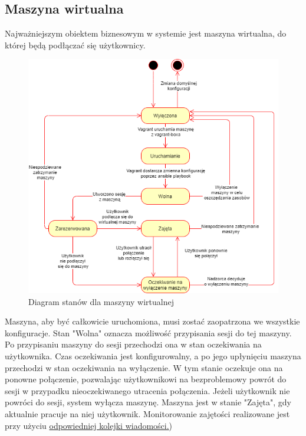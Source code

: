 \documentclass[../opis-rozwiazania.tex]{subfiles}
\begin{document}
\label{state_diagrams}

\subsection{Maszyna wirtualna}
Najważniejszym obiektem biznesowym w systemie jest maszyna wirtualna, do której będą podłączać się użytkownicy.

\begin{figure}[H]
    \centering
    \includegraphics[width=\textwidth]{../diagrams/state_diagrams/virtual_machine.png}
    \caption{Diagram stanów dla maszyny wirtualnej}
    \label{state_vm}
\end{figure}

Maszyna, aby być całkowicie uruchomiona, musi zostać zaopatrzona we wszystkie konfiguracje.
Stan "Wolna" oznacza możliwość przypisania sesji do tej maszyny.
Po przypisaniu maszyny do sesji przechodzi ona w stan oczekiwania na użytkownika. Czas oczekiwania jest konfigurowalny, a po jego upłynięciu maszyna przechodzi w stan oczekiwania na wyłączenie.
W tym stanie oczekuje ona na ponowne połączenie, pozwalając użytkownikowi na bezproblemowy powrót do sesji w przypadku nieoczekiwanego utracenia połączenia. Jeżeli użytkownik nie powróci do sesji, system wyłącza maszynę.
Maszyna jest w stanie "Zajęta", gdy aktualnie pracuje na niej użytkownik. Monitorowanie zajętości realizowane jest przy użyciu \hyperref[modules:broker:queue-users]{odpowiedniej kolejki wiadomości.})
\end{document}

